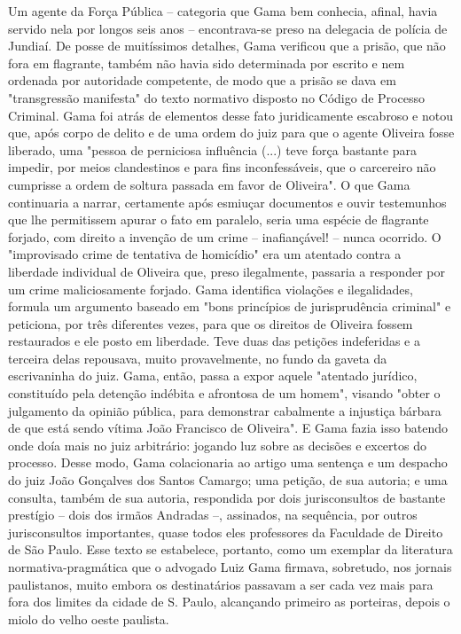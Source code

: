 {\small\noindent
Um agente da Força Pública -- categoria que Gama bem conhecia,
afinal, havia servido nela por longos seis anos -- encontrava-se preso
na delegacia de polícia de Jundiaí. De posse de muitíssimos detalhes,
Gama verificou que a prisão, que não fora em flagrante, também não havia
sido determinada por escrito e nem ordenada por autoridade competente,
de modo que a prisão se dava em "transgressão manifesta" do texto
normativo disposto no Código de Processo Criminal. Gama foi atrás de
elementos desse fato juridicamente escabroso e notou que, após corpo de
delito e de uma ordem do juiz para que o agente Oliveira fosse liberado,
uma "pessoa de perniciosa influência (...) teve força bastante para
impedir, por meios clandestinos e para fins inconfessáveis, que o
carcereiro não cumprisse a ordem de soltura passada em favor de
Oliveira". O que Gama continuaria a narrar, certamente após esmiuçar
documentos e ouvir testemunhos que lhe permitissem apurar o fato em
paralelo, seria uma espécie de flagrante forjado, com direito a invenção
de um crime -- inafiançável! -- nunca ocorrido. O "improvisado crime de
tentativa de homicídio" era um atentado contra a liberdade individual de
Oliveira que, preso ilegalmente, passaria a responder por um crime
maliciosamente forjado. Gama identifica violações e ilegalidades,
formula um argumento baseado em "bons princípios de jurisprudência
criminal" e peticiona, por três diferentes vezes, para que os direitos
de Oliveira fossem restaurados e ele posto em liberdade. Teve duas das
petições indeferidas e a terceira delas repousava, muito provavelmente,
no fundo da gaveta da escrivaninha do juiz. Gama, então, passa a expor
aquele "atentado jurídico, constituído pela detenção indébita e
afrontosa de um homem", visando "obter o julgamento da opinião pública,
para demonstrar cabalmente a injustiça bárbara de que está sendo vítima
João Francisco de Oliveira". E Gama fazia isso batendo onde doía mais no
juiz arbitrário: jogando luz sobre as decisões e excertos do processo.
Desse modo, Gama colacionaria ao artigo uma sentença e um despacho do
juiz João Gonçalves dos Santos Camargo; uma petição, de sua autoria; e
uma consulta, também de sua autoria, respondida por dois jurisconsultos
de bastante prestígio -- dois dos irmãos Andradas --, assinados, na
sequência, por outros jurisconsultos importantes, quase todos eles
professores da Faculdade de Direito de São Paulo. Esse texto se
estabelece, portanto, como um exemplar da literatura
normativa-pragmática que o advogado Luiz Gama firmava, sobretudo, nos
jornais paulistanos, muito embora os destinatários passavam a ser cada
vez mais para fora dos limites da cidade de S. Paulo, alcançando
primeiro as porteiras, depois o miolo do velho oeste paulista. }

